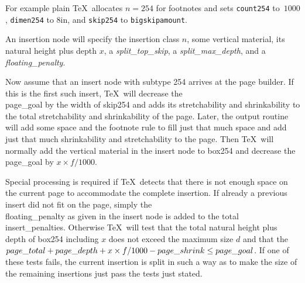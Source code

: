 For example plain \TeX\ allocates $n=254$ for footnotes and sets
{\tt count254} to~$1000$, {\tt dimen254} to 8in, and {\tt skip254} to {\tt \BS bigskipamount}.

An insertion node will specify the insertion class $n$, some vertical material,
its natural height plus depth $x$, a {\it split\-\_top\-\_skip}, a {\it split\-\_max\_depth},
and a {\it floa\-ting\-\_pe\-nal\-ty}.


Now assume that an insert node with subtype 254 arrives at the page builder.
If this is the first such insert, \TeX\ will decrease the \\{page\_goal}
by the width of skip254 and adds its stretchability and shrinkability
to the total stretchability and shrinkability of the page. Later,
the output routine will add some space and the footnote rule to fill just that
much space and add just that much shrinkability and stretchability to the page.
Then \TeX\ will normally add the vertical material in the insert node to
box254 and decrease the \\{page\_goal} by $x\times f/1000$.

Special processing is required if \TeX\ detects that there is not enough space on
the current page to accommodate the complete insertion.
If already a previous insert did not fit on the page, simply the \\{floating\_penalty}
as given in the insert node is added to the total \\{insert\_penalties}.
Otherwise \TeX\ will test that the total natural height plus depth of box254
including $x$ does not exceed the maximum size $d$ and that the
$\index{page total+\\{page\_total}}\\{page\_total} + \index{page depth+\\{page\_depth}}\\{page\_depth} + x\times f/1000 - \index{page shrink+\\{page\_shrink}}\\{page\_shrink} \le \index{page goal+\\{page\_goal}}\\{page\_goal}$.
If one of these tests fails, the current insertion
is split in such a way as to make the size of the remaining insertions just pass the tests
just stated.

